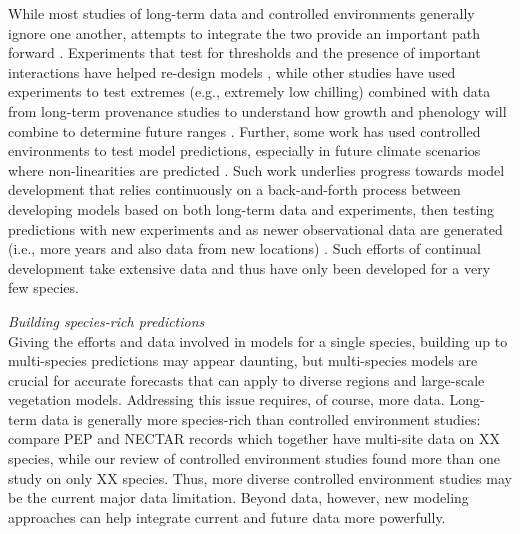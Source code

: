 \documentclass[11pt,letter]{article}
\begin{document}
While most studies of long-term data and controlled environments generally ignore one another, attempts to integrate the two provide an important path forward \citep{Caffarra:2011qf,nagano2012,satake2013,ford2016,chuinearees}. Experiments that test for thresholds and the presence of important interactions have helped re-design models \citep{Caffarra:2011qf,chuinearees}, while other studies have used experiments to test extremes (e.g., extremely low chilling) combined with data from long-term provenance studies to understand how growth and phenology will combine to determine future ranges \citep{ford2016}. Further, some work has used controlled environments to test model predictions, especially in future climate scenarios where non-linearities are predicted \citep[see][]{nagano2012}. Such work underlies progress towards model development that relies continuously on a back-and-forth process between developing models based on both long-term data and experiments, then testing predictions with new experiments and as newer observational data are generated (i.e., more years and also data from new locations) \citep{nagano2012,satake2013}. Such efforts of continual development take extensive data and thus have only been developed for a very few species.

\emph{Building species-rich predictions}\\
Giving the efforts and data involved in models for a single species, building up to multi-species predictions may appear daunting, but multi-species models are crucial for accurate forecasts that can apply to diverse regions and large-scale vegetation models. Addressing this issue requires, of course, more data. Long-term data is generally more species-rich than controlled environment studies: compare PEP and NECTAR records which together have multi-site data on XX species, while our review of controlled environment studies found more than one study on only XX species. Thus, more diverse controlled environment studies may be the current major data limitation. Beyond data, however, new modeling approaches can help integrate current and future data more powerfully. 
\end{document}
